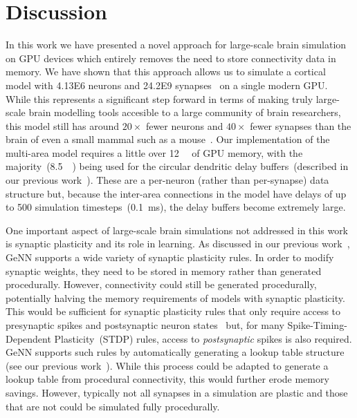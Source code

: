\documentclass[9pt,twocolumn,twoside,lineno]{pnas-new}
\begin{document}
\section*{Discussion}
In this work we have presented a novel approach for large-scale brain simulation on GPU devices which entirely removes the need to store connectivity data in memory.
We have shown that this approach allows us to simulate a cortical model with \num{4.13E6} neurons and \num{24.2E9} synapses~\citep{Schmidt2018a,Schmidt2018} on a single modern GPU.
While this represents a significant step forward in terms of making truly large-scale brain modelling tools accesible to a large community of brain researchers, this model still has around $20\times$ fewer neurons and $40\times$ fewer synapses than the brain of even a small mammal such as a mouse~\citep{Herculano-Houzel2010}.
Our implementation of the multi-area model requires a little over \SI{12}{\giga\byte} of GPU memory, with the majority~(\SI{8.5}{\giga\byte}) being used for the circular dendritic delay buffers~(described in our previous work~\citep{Knight2018}).
These are a per-neuron (rather than per-synapse) data structure but, because the inter-area connections in the model have delays of up to 500 simulation timesteps~(\SI{0.1}{\milli\second}), the delay buffers become extremely large.

One important aspect of large-scale brain simulations not addressed in this work is synaptic plasticity and its role in learning.
As discussed in our previous work~\citep{Knight2018}, GeNN supports a wide variety of synaptic plasticity rules.
In order to modify synaptic weights, they need to be stored in memory rather than generated procedurally.
However, connectivity could still be generated procedurally, potentially halving the memory requirements of models with synaptic plasticity.
This would be sufficient for synaptic plasticity rules that only require access to presynaptic spikes and postsynaptic neuron states~\cite{Brader2007,Clopath2010c} but, for many Spike-Timing-Dependent Plasticity~(STDP) rules, access to \emph{postsynaptic} spikes is also required.
GeNN supports such rules by automatically generating a lookup table structure (see our previous work~\citep{Knight2018}).
While this process could be adapted to generate a lookup table from procedural connectivity, this would further erode memory savings.
However, typically not all synapses in a simulation are plastic and those that are not could be simulated fully procedurally.
\end{document}
